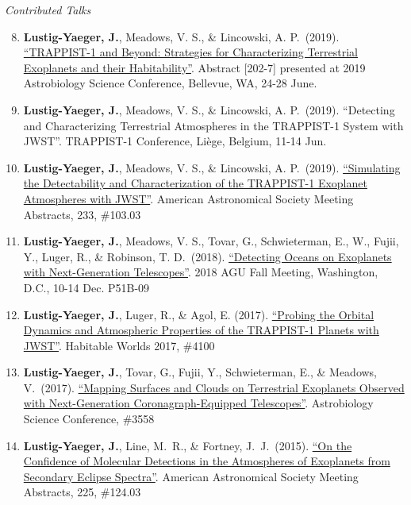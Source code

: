 \documentclass[margin,10pt]{res}
\newenvironment{benumerate}[1]{
    \let\oldItem\item
    \def\item{\addtocounter{enumi}{-2}\oldItem}
    \begin{enumerate}
    \setcounter{enumi}{#1}
    \addtocounter{enumi}{1}
}{
    \end{enumerate}
}
\begin{document}
\begin{resume}
                {\sl Contributed Talks}
                \begin{benumerate}{7}
                    \item \textbf{Lustig-Yaeger, J.}, Meadows, V. S., \& Lincowski, A. P.\ (2019). \href{https://docs.google.com/viewer?url=https://agu.confex.com/agu/abscicon19/mediafile/ExtendedAbstract/Paper481632/JLY_AbSciCon2019_Abstract3.pdf}{``TRAPPIST-1 and Beyond: Strategies for Characterizing Terrestrial Exoplanets and their Habitability''}. Abstract [202-7] presented at 2019 Astrobiology Science Conference, Bellevue, WA, 24-28 June. 
                    \item \textbf{Lustig-Yaeger, J.}, Meadows, V. S., \& Lincowski, A. P.\ (2019). ``Detecting and Characterizing Terrestrial Atmospheres in the TRAPPIST-1 System with JWST''. TRAPPIST-1 Conference, Li\`ege, Belgium, 11-14 Jun. 
                    \item \textbf{Lustig-Yaeger, J.}, Meadows, V. S., \& Lincowski, A. P.\ (2019). \href{http://adsabs.harvard.edu/abs/2019AAS...23310303L}{``Simulating the Detectability and Characterization of the TRAPPIST-1 Exoplanet Atmospheres with JWST''}. American Astronomical Society Meeting Abstracts, 233, \#103.03
                    \item \textbf{Lustig-Yaeger, J.}, Meadows, V. S., Tovar, G., Schwieterman, E., W., Fujii, Y., Luger, R., \& Robinson, T. D.\ (2018). \href{https://agu.confex.com/agu/fm18/prelim.cgi/Paper/384157}{``Detecting Oceans on Exoplanets with Next-Generation Telescopes''}. 2018 AGU Fall Meeting, Washington, D.C., 10-14 Dec. P51B-09
                    \item \textbf{Lustig-Yaeger, J.}, Luger, R., \& Agol, E. (2017). \href{https://www.hou.usra.edu/meetings/habitableworlds2017/pdf/4100.pdf}{``Probing the Orbital Dynamics and Atmospheric Properties of the TRAPPIST-1 Planets with JWST''}. Habitable Worlds 2017, \#4100
                    \item \textbf{Lustig-Yaeger, J.}, Tovar, G., Fujii, Y., Schwieterman, E., \& Meadows, V.\ (2017). \href{http://www.lpi.usra.edu/meetings/abscicon2017/pdf/3558.pdf}{``Mapping Surfaces and Clouds on Terrestrial Exoplanets Observed with Next-Generation Coronagraph-Equipped Telescopes''}. Astrobiology Science Conference, \#3558
                    \item \textbf{Lustig-Yaeger, J.}, Line, M.~R., \& Fortney, J.~J.\ (2015). \href{http://adsabs.harvard.edu/abs/2015AAS...22512403L}{``On the Confidence of Molecular Detections in the Atmospheres of Exoplanets from Secondary Eclipse Spectra''}. American Astronomical Society Meeting Abstracts, 225, \#124.03\\ 
                \end{benumerate}
                

\end{resume}
\end{document}
